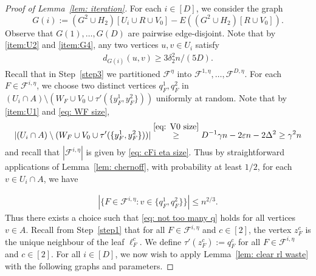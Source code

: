 \documentclass[a4paper, 11pt, reqno]{amsart}
\numberwithin{equation}{section}
\newcommand{\1}{{\rm 1\hspace*{-0.4ex}%
\rule{0.1ex}{1.52ex}\hspace*{0.2ex}}}
\newcommand{\cF}{\mathcal{F}}
\newcommand{\sF}{\mathscr{F}}
\renewcommand{\epsilon}{\varepsilon}
\newcommand{\COMMENT}[1]{}
\newcounter{step}
\begin{document}
\begin{proof}[Proof of Lemma~\ref{lem: iteration}]
For each $i\in [D]$, we consider the graph  
$$G(i):= (G^2\cup H_2) [U_i\cup R\cup V_0] - E((G^2\cup H_2)[R\cup V_0]).$$ 
Observe that $G(1),\dots, G(D)$ are pairwise edge-disjoint. 
Note that by \ref{item:U2} and \ref{item:G4}, 
any two vertices $u,v\in U_i$ satisfy
\begin{align}\label{eq: G(i) codegree}
d_{G(i)}(u,v) \geq 3\delta_2^2 n/(5D).
\end{align}
Recall that in Step~\ref{step3} we partitioned $\sF^\eta$ into $\sF^{1,\eta},\ldots,\sF^{D,\eta}$.
For each $F\in \sF^{i,\eta}$, 
we choose two distinct vertices $q^1_F, q^2_F$ in $(U_i\cap A)\setminus (W_F \cup V_0 \cup \tau'(\{y^1_F, y^2_F\}))$ uniformly at random. 
Note that by \ref{item:U1} and \eqref{eq: WF size}, 
$$|(U_i\cap A)\setminus (W_F \cup V_0 \cup \tau'(\{y^1_F, y^2_F\}))| \stackrel{\eqref{eq: V0 size}}{\geq} D^{-1}\gamma n - 2\epsilon n - 2\Delta^2 \geq \gamma^2 n$$ 
and recall that $|\sF^{i,\eta}|$ is given by \eqref{eq: cFi eta size}.
Thus by straightforward applications of Lemma~\ref{lem: chernoff}, 
with probability at least $1/2$, for each $v\in U_i\cap A$, we have
\COMMENT{For a vertex $v$, $\mathbb{P}[v\in \{q^1_F,q^2_F\}]\leq  \frac{2}{\gamma^2 n}.$ 
Thus $\mathbb{E}[|\{F: v\in \{q^1_F,q^2_F\}\}|] \leq  \frac{2(1\pm \epsilon^{1/2})D^{-1}n/2}{\gamma^2 n}$. 
Then Chernoff gives us that
$\mathbb{P}[|\{F: v\in \{q^1_F,q^2_F\}\}|\leq  n^{2/3}] \geq 1 - c^{n^{4/3}/n}\geq 1- c^{n^{1/4}}$ for a constant $0<c<1$. 
Thus with probability at least $1- nc^{n^{1/4}}$, this happens for all $v\in A$ and all $i\in [D]$. } 
\begin{align}\label{eq: not too many q}
|\{ F\in \sF^{i,\eta}: v\in \{q^1_F,q^2_F\}\}| %
\leq n^{2/3}. %
\end{align}
Thus there exists a choice such that \eqref{eq: not too many q} holds for all vertices $v\in A$. 
Recall from Step~\ref{step1} that for all $F\in \sF^{i,\eta}$ and $c\in[2]$,
the vertex $z_F^c$ is the unique neighbour of the leaf $\ell^c_F $.
We define $\tau'(z^c_F):= q^c_F$ for all $F\in \sF^{i,\eta}$ and $c\in [2]$. 
For all $i\in [D]$, we now wish to apply Lemma~\ref{lem: clear rl waste} with the following graphs and parameters. \newline


\end{proof}
\end{document}
